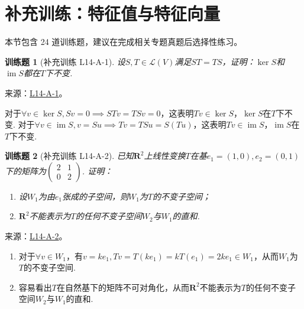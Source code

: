 \documentclass[12pt,fontset=fandol]{ctexart}
\newtheorem{exercise}{训练题}[section]
\begin{document}
\section{补充训练：特征值与特征向量}

本节包含 24 道训练题，建议在完成相关专题真题后选择性练习。

\begin{exercise}[补充训练 L14-A-1]\label{prob:L14-A-1}
设$S,T\in \mathcal{L}(V)$满足$ST=TS$，证明：$\ker S$和$\operatorname{im} S$都在$T$下不变.
\end{exercise}
\noindent 来源：\href{https://github.com/yhwu-is/Linear-Algebra-Left-Undone/blob/new/%E8%AE%B2%E4%B9%89/%E4%B8%93%E9%A2%98/14%20%E7%9B%B8%E4%BC%BC%E6%A0%87%E5%87%86%E5%BD%A2%EF%BC%9A%E5%8A%A8%E6%9C%BA%E4%B8%8E%E5%9F%BA%E7%A1%80.tex}{L14-A-1}。
\begin{solve}
对于$\forall v\in\ker S,Sv=0\implies STv=TSv=0$，这表明$Tv\in \ker S$，$\ker S$在$T$下不变.
            对于$\forall v \in \operatorname{im} S,v=Su\implies Tv=TSu=S(Tu)$，这表明$Tv \in \operatorname{im} S$，$\operatorname{im} S$在$T$下不变.
\end{solve}

\begin{exercise}[补充训练 L14-A-2]\label{prob:L14-A-2}
已知$\mathbf{R}^2$上线性变换$T$在基$e_1=(1,0),e_2=(0,1)$下的矩阵为$\begin{pmatrix}2 & 1 \\ 0 & 2\end{pmatrix}$. 证明：
        \begin{enumerate}
            \item 设$W_1$为由$e_1$张成的子空间，则$W_1$为$T$的不变子空间；

            \item $\mathbf{R}^2$不能表示为$T$的任何不变子空间$W_2$与$W_1$的直和.
        \end{enumerate}
\end{exercise}
\noindent 来源：\href{https://github.com/yhwu-is/Linear-Algebra-Left-Undone/blob/new/%E8%AE%B2%E4%B9%89/%E4%B8%93%E9%A2%98/14%20%E7%9B%B8%E4%BC%BC%E6%A0%87%E5%87%86%E5%BD%A2%EF%BC%9A%E5%8A%A8%E6%9C%BA%E4%B8%8E%E5%9F%BA%E7%A1%80.tex}{L14-A-2}。
\begin{solve}
\begin{enumerate}
                \item 对于$\forall v\in W_1$，有$v=ke_1,Tv=T(ke_1)=kT(e_1)=2ke_1\in W_1$，从而$W_1$为$T$的不变子空间.
                \item 容易看出$T$在自然基下的矩阵不可对角化，从而$\mathbf{R}^2$不能表示为$T$的任何不变子空间$W_2$与$W_1$的直和.
            \end{enumerate}
\end{solve}
\end{document}
